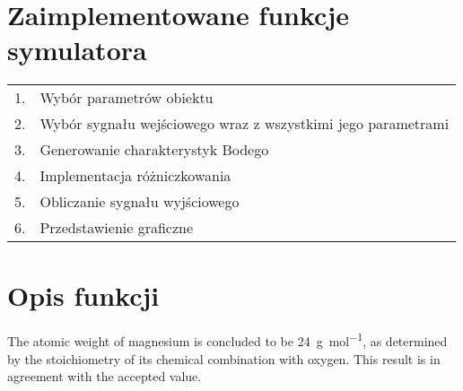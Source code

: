 \documentclass[
	letterpaper, %
	10pt, %
]{CSUniSchoolLabReport}
\begin{document}
 

\section{Zaimplementowane funkcje symulatora}

\begin{tabular}{l l}
	1. & Wybór parametrów obiektu\\ %
	2. & Wybór sygnału wejściowego wraz z wszystkimi jego parametrami\\
	3. & Generowanie charakterystyk Bodego\\
	4. & Implementacja różniczkowania\\
	5. & Obliczanie sygnału wyjściowego\\
	6. & Przedstawienie graficzne\\
\end{tabular}



\section{Opis funkcji}

The atomic weight of magnesium is concluded to be \SI{24}{\gram\per\mol}, as determined by the stoichiometry of its chemical combination with oxygen. This result is in agreement with the accepted value.
\end{document}
